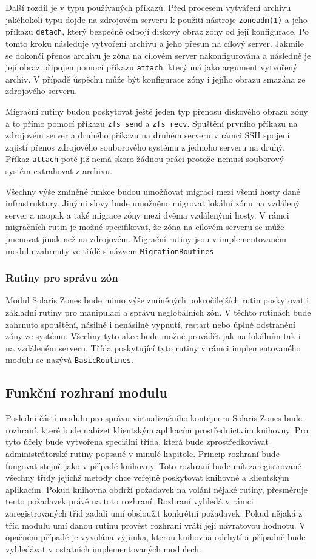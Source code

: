 Další rozdíl je v typu používaných příkazů. Před procesem vytváření archivu jakéhokoli typu dojde na zdrojovém serveru k 
použití nástroje \verb|zoneadm(1)| a jeho příkazu \verb|detach|, který bezpečně odpojí diskový obraz zóny od její konfigurace.
Po tomto kroku následuje vytvoření archivu a jeho přesun na cílový server. Jakmile se dokončí přenos archivu je zóna na cílovém
server nakonfigurována a následně je její obraz připojen pomocí příkazu \verb|attach|, který má jako argument vytvořený archiv.
V případě úspěchu může být konfigurace zóny i jejího obrazu smazána ze zdrojového serveru.

Migrační rutiny budou poskytovat ještě jeden typ přenosu diskového obrazu zóny a to přímo pomocí příkazu \verb|zfs send|
a \verb|zfs recv|. Spuštění prvního příkazu na zdrojovém server a druhého příkazu na druhém serveru v rámci SSH spojení
zajistí přenos zdrojového souborového systému z jednoho serveru na druhý. Příkaz \verb|attach| poté již nemá skoro žádnou práci
protože nemusí souborový systém extrahovat z archivu.

Všechny výše zmíněné funkce budou umožňovat migraci mezi všemi hosty dané infrastruktury. Jinými slovy bude umožněno migrovat 
lokální zónu na vzdálený server a naopak a také migrace zóny mezi dvěma vzdálenými hosty. V rámci migračních rutin je možné specifikovat,
že zóna na cílovém serveru se může jmenovat jinak než na zdrojovém. Migrační rutiny jsou v implementovaném modulu zahrnuty
ve třídě s názvem \verb|MigrationRoutines|
\subsubsection{Rutiny pro správu zón}
\label{chapter:implementation:szones:routines:management}
Modul Solaris Zones bude mimo výše zmíněných pokročilejších rutin poskytovat i základní rutiny pro manipulaci a správu 
neglobálních zón. V těchto rutinách bude zahrnuto spouštění, násilné i nenásilné vypnutí, restart nebo úplné odstranění zóny
ze systému. Všechny tyto akce bude možné provádět jak na lokálním tak i na vzdáleném serveru. Třída poskytující tyto
rutiny v rámci implementovaného modulu se nazývá \verb|BasicRoutines|.
\subsection{Funkční rozhraní modulu}
\label{chapter:implementation:szones:api}
Poslední částí modulu pro správu virtualizačního kontejneru Solaris Zones bude rozhraní, které bude nabízet klientským aplikacím
prostřednictvím knihovny. Pro tyto účely bude vytvořena speciální třída, která bude zprostředkovávat administrátorské rutiny popsané 
v minulé kapitole. Princip rozhraní bude fungovat stejně jako v případě knihovny. Toto rozhraní bude mít zaregistrované všechny 
třídy jejichž metody chce veřejně poskytovat knihovně a klientským aplikacím. Pokud knihovna obdrží požadavek na volání nějaké
rutiny, přesměruje tento požadavek právě na toto rozhraní. Rozhraní vyhledá v rámci zaregistrovaných tříd zadali umí obsloužit
konkrétní požadavek. Pokud nějaká z tříd modulu umí danou rutinu provést rozhraní vrátí její návratovou hodnotu. V opačném případě
je vyvolána výjimka, kterou knihovna odchytí a případně bude vyhledávat v ostatních implementovaných modulech.

